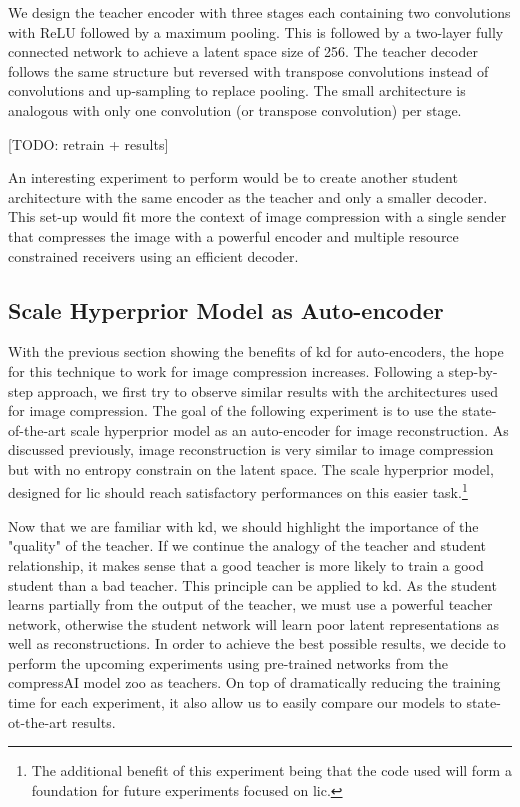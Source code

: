 We design the teacher encoder with three stages each containing two convolutions with ReLU followed by a maximum pooling. This is followed by a two-layer fully connected network to achieve a latent space size of 256. The teacher decoder follows the same structure but reversed with transpose convolutions instead of convolutions and up-sampling to replace pooling. The small architecture is analogous with only one convolution (or transpose convolution) per stage.

[TODO: retrain + results]

An interesting experiment to perform would be to create another student architecture with the same encoder as the teacher and only a smaller decoder. This set-up would fit more the context of image compression with a single sender that compresses the image with a powerful encoder and multiple resource constrained receivers using an efficient decoder.

\subsection{Scale Hyperprior Model as Auto-encoder}
\label{scale_hyperprior_ae}
With the previous section showing the benefits of \acrshort{kd} for auto-encoders, the hope for this technique to work for image compression increases. Following a step-by-step approach, we first try to observe similar results with the architectures used for image compression. The goal of the following experiment is to use the state-of-the-art scale hyperprior model as an auto-encoder for image reconstruction. As discussed previously, image reconstruction is very similar to image compression but with no entropy constrain on the latent space. The scale hyperprior model, designed for \acrshort{lic} should reach satisfactory performances on this easier task.\footnote{The additional benefit of this experiment being that the code used will form a foundation for future experiments focused on \acrshort{lic}.}


Now that we are familiar with \acrshort{kd}, we should highlight the importance of the "quality" of the teacher. If we continue the analogy of the teacher and student relationship, it makes sense that a good teacher is more likely to train a good student than a bad teacher. This principle can be applied to \acrshort{kd}. As the student learns partially from the output of the teacher, we must use a powerful teacher network, otherwise the student network will learn poor latent representations as well as reconstructions. In order to achieve the best possible results, we decide to perform the upcoming experiments using pre-trained networks from the compressAI model zoo as teachers. On top of dramatically reducing the training time for each experiment, it also allow us to easily compare our models to state-ot-the-art results.

